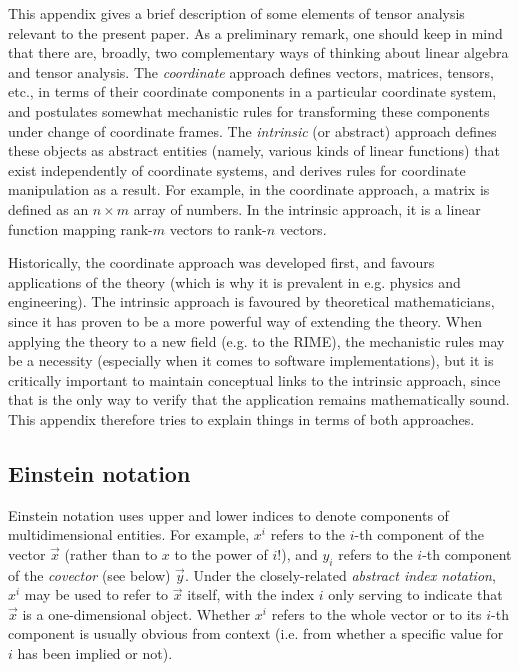 \documentclass{aa}
\begin{document}
This appendix gives a brief description of some elements of tensor analysis relevant to the present paper. As a preliminary remark, one should keep in mind that there are, broadly, two complementary ways of thinking about linear algebra and tensor analysis. The \emph{coordinate} approach defines vectors, matrices, tensors, etc., in terms of their coordinate components in a particular coordinate system, and postulates somewhat mechanistic rules for transforming these components under change of coordinate frames. The \emph{intrinsic} (or abstract) approach defines these objects as abstract entities (namely, various kinds of linear functions) that exist independently of coordinate systems, and derives rules for coordinate manipulation as a result. For example, in the coordinate approach, a matrix is defined as an $n\times m$ array of numbers. In the intrinsic approach, it is a linear function mapping rank-$m$ vectors to rank-$n$ vectors.

Historically, the coordinate approach was developed first, and favours applications of the theory (which is why it is prevalent in e.g. physics and engineering). The intrinsic approach is favoured by theoretical mathematicians, since it has proven to be a more powerful way of extending the theory. When applying the theory to a new field (e.g. to the RIME), the mechanistic rules may be a necessity (especially when it comes to software implementations), but it is critically important to maintain conceptual links to the intrinsic approach, since that is the only way to verify that the application remains mathematically sound. This appendix therefore tries to explain things in terms of both approaches.

\subsection{Einstein notation}

Einstein notation uses upper and lower indices to denote components of multidimensional entities. For example, $x^i$ refers to the $i$-th component  of the vector $\vec x$ (rather than to $x$ to the power of $i$!), and $y_i$ refers to the $i$-th component of the \emph{covector} (see below) $\vec y$. Under the closely-related \emph{abstract index notation}, $x^i$ may be used to refer to $\vec x$ itself, with the index $i$ only serving to indicate that $\vec x$ is a one-dimensional object. Whether $x^i$ refers to the whole vector or to its $i$-th component is usually obvious from context (i.e. from whether a specific value for $i$ has been implied or not).
\end{document}
